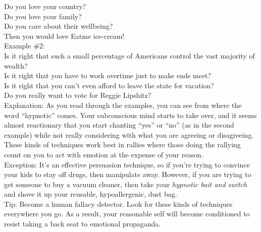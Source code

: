 \documentclass[a4paper,12pt,single,pdftex]{scrartcl}
\begin{document}
    
      Do you love your country?
    \\

    
      Do you love your family?
    \\

    
      Do you care about their wellbeing?
    \\

    
      Then you would love Eatme ice-cream!
    \\

    
      Example \#2:
    \\

    
      Is it right that such a small percentage of Americans control the vast majority of wealth?
    \\

    
      Is it right that you have to work overtime just to make ends meet?
    \\

    
      Is it right that you can’t even afford to leave the state for vacation?
    \\

    
      Do you really want to vote for Reggie Lipshitz?
    \\

    
      Explanation: As you read through the examples, you can see from where the word “hypnotic” comes.  Your subconscious mind starts to take over, and it seems almost reactionary that you start chanting “yes” or “no” (as in the second example) while not really considering with what you are agreeing or disagreeing.  These kinds of techniques work best in rallies where those doing the rallying count on you to act with emotion at the expense of your reason.
    \\

    
      Exception: It’s an effective persuasion technique, so if you're trying to convince your kids to stay off drugs, then manipulate away.  However, if you are trying to get someone to buy a vacuum cleaner, then take your {\it hypnotic bait and switch} and shove it up your reusable, hypoallergenic, dust bag.
    \\

    
      Tip: Become a human fallacy detector.  Look for these kinds of techniques everywhere you go.  As a result, your reasonable self will become conditioned to resist taking a back seat to emotional propaganda.
    \\
\end{document}
